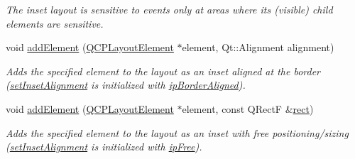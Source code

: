 \begin{DoxyCompactItemize}
\begin{DoxyCompactList}\small\item\em The inset layout is sensitive to events only at areas where its (visible) child elements are sensitive. \end{DoxyCompactList}\item 
void \hyperlink{classQCPLayoutInset_ad61529eb576af7f04dff94abb10c745a}{add\+Element} (\hyperlink{classQCPLayoutElement}{Q\+C\+P\+Layout\+Element} $\ast$element, Qt\+::\+Alignment alignment)
\begin{DoxyCompactList}\small\item\em Adds the specified {\itshape element} to the layout as an inset aligned at the border (\hyperlink{classQCPLayoutInset_a62882a4f9ad58bb0f53da12fde022abe}{set\+Inset\+Alignment} is initialized with \hyperlink{classQCPLayoutInset_a8b9e17d9a2768293d2a7d72f5e298192aa81e7df4a785ddee2229a8f47c46e817}{ip\+Border\+Aligned}). \end{DoxyCompactList}\item 
void \hyperlink{classQCPLayoutInset_a8ff61fbee4a1f0ff45c398009d9f1e56}{add\+Element} (\hyperlink{classQCPLayoutElement}{Q\+C\+P\+Layout\+Element} $\ast$element, const Q\+Rect\+F \&\hyperlink{classQCPLayoutElement_affdfea003469aac3d0fac5f4e06171bc}{rect})
\begin{DoxyCompactList}\small\item\em Adds the specified {\itshape element} to the layout as an inset with free positioning/sizing (\hyperlink{classQCPLayoutInset_a62882a4f9ad58bb0f53da12fde022abe}{set\+Inset\+Alignment} is initialized with \hyperlink{classQCPLayoutInset_a8b9e17d9a2768293d2a7d72f5e298192aa4802986ea2cea457f932b115acba59e}{ip\+Free}). \end{DoxyCompactList}\end{DoxyCompactItemize}
